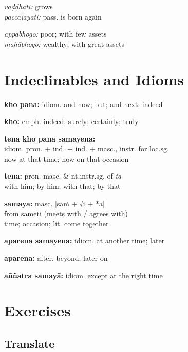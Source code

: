 \documentclass[11pt,oneside]{memoir}
\begin{document}
\normalArrayStretch

\bigskip

\begin{twocols}
\emph{vaḍḍhati:} grows \\
\emph{paccājāyati:} pass. is born again

\columnbreak

\emph{appabhogo:} poor; with few assets \\
\emph{mahābhogo:} wealthy; with great assets
\end{twocols}
\section{Indeclinables and Idioms}
\label{sec:orgefd877d}

\begin{multicols}{2}

\textbf{kho pana:} idiom. and now; but; and next; indeed

\textbf{kho:} emph. indeed; surely; certainly; truly

\textbf{tena kho pana samayena:} \\
idiom. pron. + ind. + ind. + masc., instr. for loc.sg. \\
now at that time; now on that occasion

\textbf{tena:} pron. masc. \& nt.instr.sg. of \emph{ta} \\
with him; by him; with that; by that

\columnbreak

\textbf{samaya:} masc. [saṁ + √i + *a] \\
from sameti (meets with / agrees with) \\
time; occasion; lit. come together

\textbf{aparena samayena:} idiom. at another time; later

\textbf{aparena:} after, beyond; later on

\textbf{aññatra samayā:} idiom. except at the right time

\end{multicols}

\clearpage
\section{Exercises}
\label{sec:org2d29536}
\subsection{Translate}
\label{sec:orgcf0db85}
\end{document}
